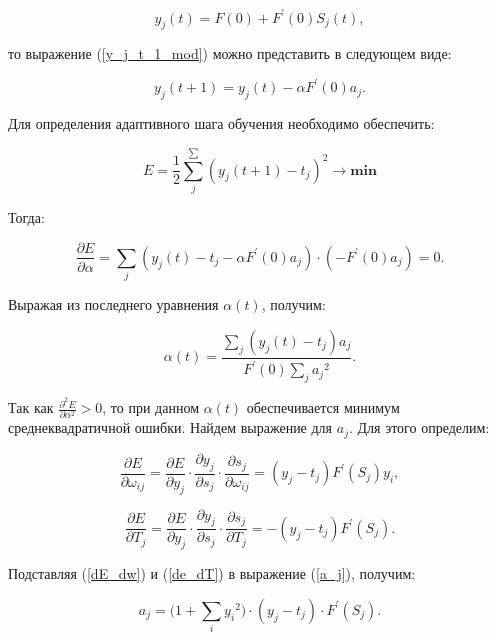 \begin{equation}
    y_j(t) = F(0) + F^\prime(0)S_j(t),
\end{equation}

то выражение (\ref{y_j_t_1_mod}) можно представить в следующем виде:

\begin{equation}
    y_j(t + 1) = y_j(t) - \alpha F^\prime(0) a_j.
\end{equation}

Для определения адаптивного шага обучения необходимо обеспечить:

\begin{equation}
    E = \frac{1}{2}\sum_{j}^{\sum}{(y_j(t + 1) - t_j)^2\rightarrow\mathbf{min}}
\end{equation}

Тогда:

\begin{equation}
    \frac{\partial E}{\partial\alpha} = \sum_{j}{(y_j(t) - t_j - \alpha F^\prime(0)a_j)\cdot(-F^\prime(0) a_j) = 0}.
\end{equation}

Выражая из последнего уравнения $\alpha(t)$, получим:

\begin{equation}\label{alpha_t}
    \alpha(t) = \frac{\sum_{j}{(y_j(t) - t_j) a_j}}{F^\prime(0)\sum_{j}{a_j}^2}.
\end{equation}

Так как $\frac{\partial^2E}{\partial\alpha^2} > 0$, то при данном $\alpha(t)$ обеспечивается минимум среднеквадратичной ошибки. Найдем выражение для $a_j$. Для этого определим:

\begin{equation}\label{dE_dw}
    \frac{\partial E}{\partial\omega_{ij}} = \frac{\partial E}{\partial y_j}\cdot\frac{\partial y_j}{\partial s_j}\cdot\frac{\partial s_j}{\partial\omega_{i j}}=(y_j - t_j)F^\prime(S_j) y_i,
\end{equation}

\begin{equation}\label{de_dT}
    \frac{\partial E}{\partial T_j} = \frac{\partial E}{\partial y_j}\cdot\frac{\partial y_j}{\partial s_j}\cdot\frac{\partial s_j}{\partial T_j} = -(y_j - t_j)F^\prime(S_j).
\end{equation}

Подставляя (\ref{dE_dw}) и (\ref{de_dT}) в выражение (\ref{a_j}), получим:

\begin{equation}\label{a_j_mod}
    a_j = (1 + \sum_{i}{{y_i}^2)\cdot(y_j - t_j)}\cdot F^\prime(S_j).
\end{equation}

